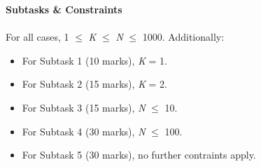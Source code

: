 \documentclass{article}
\begin{document}
\textbf{Subtasks \& Constraints} \\
\ \\
For all cases, 1 $\leq$ \emph{K} $\leq$ \emph{N} $\leq$ 1000. Additionally:
\begin{itemize}
	\item For Subtask 1 (10 marks), \emph{K} = 1.
	\item For Subtask 2 (15 marks), \emph{K} = 2.
	\item For Subtask 3 (15 marks), \emph{N} $\leq$ 10.
	\item For Subtask 4 (30 marks), \emph{N} $\leq$ 100.
	\item For Subtask 5 (30 marks), no further contraints apply.
\end{itemize}
	
\end{document}
